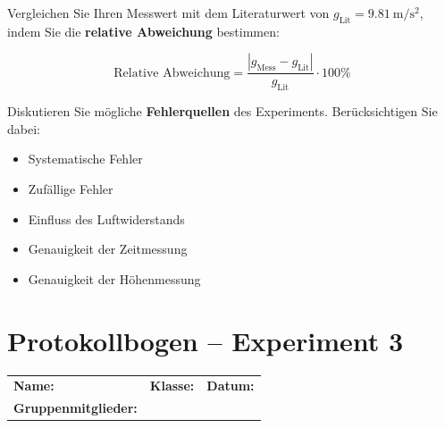 \documentclass[11pt,a4paper]{scrartcl}
\begin{document}
	\begin{aufgabe}[title={\faIcon{pencil-alt} Aufgabe 3: Vergleich mit Literaturwert}]
		Vergleichen Sie Ihren Messwert mit dem Literaturwert von $g_{\text{Lit}} = \SI{9,81}{\metre\per\second\squared}$, indem Sie die \textbf{relative Abweichung} bestimmen:
		
		\begin{equation*}
			\text{Relative Abweichung} = \frac{|g_{\text{Mess}} - g_{\text{Lit}}|}{g_{\text{Lit}}} \cdot 100\%
		\end{equation*}
	\end{aufgabe}
	
	\begin{sternaufgabe}[title={\faIcon{star} Aufgabe 4: Fehleranalyse}]
		Diskutieren Sie mögliche \textbf{Fehlerquellen} des Experiments. Berücksichtigen Sie dabei:
		
		\begin{itemize}
			\item Systematische Fehler
			\item Zufällige Fehler
			\item Einfluss des Luftwiderstands
			\item Genauigkeit der Zeitmessung
			\item Genauigkeit der Höhenmessung
		\end{itemize}
	\end{sternaufgabe}
	
	\newpage
	\section*{Protokollbogen -- Experiment 3}
	
	\begin{center}
		\begin{tcolorbox}[colback=white, colframe=black, width=\textwidth, boxrule=0.5pt]
			\begin{tabular}{@{}p{0.32\textwidth}p{}p{}@{}}
				\textbf{Name:} \hrulefill & \textbf{Klasse:} \hrulefill & \textbf{Datum:} \hrulefill \\[0.4cm]
				\textbf{Gruppenmitglieder:} & \multicolumn{2}{l}{\hrulefill} \\
			\end{tabular}
		\end{tcolorbox}
	\end{center}
	
\end{document}
